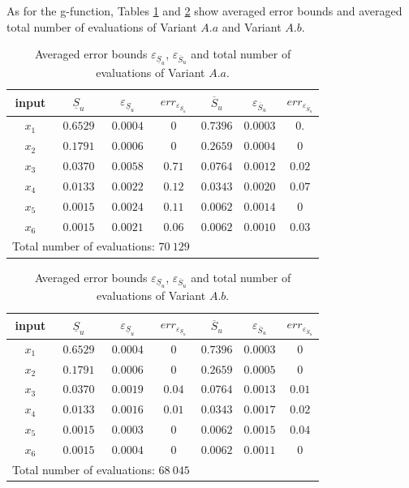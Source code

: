 As for the g-function, Tables \ref{res.bratley.Aa} and \ref{res.bratley.Ab} show averaged error bounds and averaged total number of evaluations of Variant $A.a$ and Variant $A.b$.
\begin{table}[!ht]
\caption{Averaged error bounds $\varepsilon_{\underline{S}_u}$, $\varepsilon_{\overline{S}_u}$ and total number of evaluations of Variant $A.a$.}
\centering
\begin{tabular}{ccccccc}
\hline
 input & $\underline{S}_u$ & $\varepsilon_{\underline{S}_u}$ & ${err}_{\varepsilon_{\underline{S}_u}}$ & $\overline{S}_u$ & $\varepsilon_{\overline{S}_u}$ &$err_{\varepsilon_{\overline{S}_u}}$ \\ \hline
 $x_1$ & $0.6529$ &  $0.0004$ & $0$ & $0.7396$ & $0.0003$ & $0.$ \\ \hline
 $x_2$ & $0.1791$ &  $0.0006$ & $0$ & $0.2659$ & $0.0004$ & $0$ \\ \hline
 $x_3$ & $0.0370$ &  $0.0058$ & $0.71$ & $0.0764$ & $0.0012$ & $0.02$ \\ \hline
 $x_4$ & $0.0133$ &  $0.0022$ & $0.12$ & $0.0343$ & $0.0020$ & $0.07$ \\ \hline
 $x_5$ & $0.0015$ &  $0.0024$ & $0.11$ & $0.0062$ & $0.0014$ & $0$ \\ \hline
 $x_6$ & $0.0015$ & $0.0021$ & $0.06$  & $0.0062$ & $0.0010$ & $0.03$ \\ \hline \hline
\multicolumn{4}{l}{Total number of evaluations: $70 \ 129$} & & &\\ \hline 
\end{tabular}
\label{res.bratley.Aa}
\end{table}
\begin{table}[!ht]
\caption{Averaged error bounds $\varepsilon_{\underline{S}_u}$, $\varepsilon_{\overline{S}_u}$ and total number of evaluations of Variant $A.b$.}
\centering
\begin{tabular}{ccccccc}
\hline
 input & $\underline{S}_u$ & $\varepsilon_{\underline{S}_u}$ & ${err}_{\varepsilon_{\underline{S}_u}}$ & $\overline{S}_u$ & $\varepsilon_{\overline{S}_u}$ &$err_{\varepsilon_{\overline{S}_u}}$ \\ \hline
 $x_1$ & $0.6529$ &  $0.0004$ & $0$ & $0.7396$ & $0.0003$ & $0$ \\ \hline
 $x_2$ & $0.1791$ &  $0.0006$ & $0$ & $0.2659$ & $0.0005$ & $0$ \\ \hline
 $x_3$ & $0.0370$ &  $0.0019$ & $0.04$ & $0.0764$ & $0.0013$ & $0.01$ \\ \hline
 $x_4$ & $0.0133$ &  $0.0016$ & $0.01$ & $0.0343$ & $0.0017$ & $0.02$ \\ \hline
 $x_5$ & $0.0015$ &  $0.0003$ & $0$ & $0.0062$ & $0.0015$ & $0.04$ \\ \hline
 $x_6$ & $0.0015$ &  $0.0004$ & $0$  & $0.0062$ & $0.0011$ & $0$ \\ \hline \hline
\multicolumn{4}{l}{Total number of evaluations: $68 \ 045$} & & &\\ \hline 
\end{tabular}
\label{res.bratley.Ab}
\end{table}
